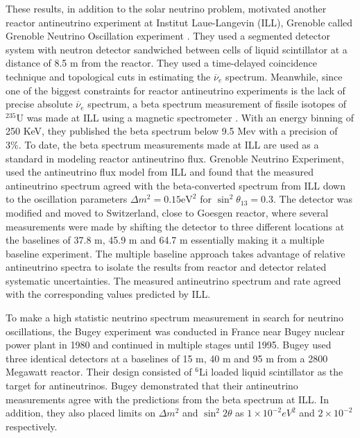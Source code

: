 \documentclass[11pt]{article}
\newcommand{\nuebar}{\ensuremath{\overline{\nu }_{e}} \hspace{1pt}}
\numberwithin{equation}{section}
\begin{document}
These results, in addition to the solar neutrino problem, motivated another reactor antineutrino experiment at Institut Laue-Langevin (ILL), Grenoble called Grenoble Neutrino Oscillation experiment \cite{PhysRevD.24.1097}. They used a segmented detector system with neutron detector sandwiched between cells of liquid scintillator at a distance of 8.5 m from the reactor.  They used a time-delayed coincidence technique and topological cuts in estimating the \nuebar spectrum. Meanwhile, since one of the biggest constraints for reactor antineutrino experiments is the lack of precise absolute \nuebar  spectrum, a beta spectrum measurement of fissile isotopes of $^{235} \textrm{U}$ was made at ILL using a magnetic spectrometer \cite{Schreckenbach1985325}. With an energy binning of 250 KeV, they published the beta spectrum below 9.5 Mev with a precision of 3\%. To date, the beta spectrum measurements made at ILL are used as a standard in modeling reactor antineutrino flux. Grenoble Neutrino Experiment, used the antineutrino flux model from ILL and found that the measured antineutrino spectrum agreed with the beta-converted spectrum from ILL down to the oscillation parameters $\Delta m^{2}= 0.15 \text{eV}^{2}$ for $ \sin ^{2}\theta_{13} = 0.3$. The detector was modified and moved to Switzerland, close to Goesgen reactor, where several measurements were made by shifting the detector to three different locations at the baselines of 37.8 m, 45.9 m and 64.7 m essentially making it a multiple baseline experiment. The multiple baseline approach takes advantage of relative antineutrino spectra to isolate the results from reactor and detector related systematic uncertainties. The measured antineutrino spectrum and rate agreed with the corresponding values predicted by ILL.  



To make a high statistic neutrino spectrum measurement in search for neutrino oscillations, the Bugey experiment was conducted in France near Bugey nuclear power plant in 1980 \cite{kwon1981experimental} and continued in multiple stages until 1995. Bugey used three identical detectors at a baselines of 15 m, 40 m and 95 m from a 2800 Megawatt reactor. Their design consisted of $^{6}$Li loaded liquid scintillator as the target for antineutrinos. Bugey demonstrated that their antineutrino measurements agree with the predictions from the beta spectrum at ILL. In addition, they also placed limits on $\Delta m^{2}$ and $\sin^{2} 2 \theta$ as $ 1 \times10^{-2} eV^{2}$ and $ 2 \times10^{-2}$ \cite{achkar1995search} respectively.
\end{document}
